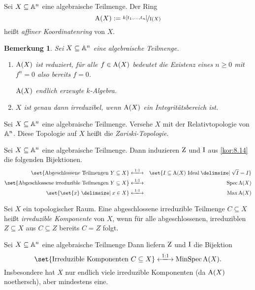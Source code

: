 \documentclass[12pt,a4paper]{scrartcl}
\theoremstyle{cplain}
\theoremstyle{cdef}
\newtheorem{beme}[thmcounter]{Bemerkung}
\begin{document}
\begin{defi}
	Sei $X\subseteq \mathbb A^n$ eine algebraische Teilmenge. Der Ring
	\[\operatorname{A}(X) := \nicefrac{k[t_1,\dots, t_n]}{\operatorname{I}(X)}\]
	heißt \emph{affiner Koordinatenring} von $X$.
	
\end{defi}
\begin{beme}
	Sei $X\subseteq \mathbb A^n$ eine algebraische Teilmenge.
	\begin{enumerate}
		\item $\operatorname{A}(X)$ ist \emph{reduziert}, für alle $f\in \operatorname{A}(X)$ bedeutet die Existenz eines $n\ge 0$ mit $f^n = 0$ also bereits $f = 0$.
		
		$\operatorname{A}(X)$ endlich erzeugte $k$-Algebra.
		\item $X$ ist genau dann irreduzibel, wenn $\operatorname{A}(X)$ ein Integritätsbereich ist.
	\end{enumerate}
\end{beme}
\begin{defi}
	Sei $X\subseteq \mathbb A^n$ eine algebraische Teilmenge. Versehe $X$ mit der Relativtopologie von $\mathbb A^n$. Diese Topologie auf $X$ heißt die \emph{Zariski-Topologie}.
\end{defi}
\begin{kor}
	Sei $X\subseteq\mathbb A^n$ eine algebraische Teilmenge. Dann induzieren $\operatorname{Z}$ und $\operatorname{I}$ aus \cref{kor:8.14} die folgenden Bijektionen.
	\begin{eqnarray*}
		\set{\text{Abgeschlossene Teilmengen }Y\subseteq X} &\xlongleftrightarrow{1:1}&\set{I\subseteq \A(X) \text{ Ideal}\given \sqrt{I} = I}\\
		\set{\text{Abgeschlossene irreduzible Teilmengen }Y\subseteq X}&\xlongleftrightarrow{1:1}&\Spec \A(X)\\
		\set{\set{x}\given x\in X}&\xlongleftrightarrow{1:1}&\Max \A(X)
	\end{eqnarray*}
\end{kor}
\begin{defi}
	Sei $X$ ein topologischer Raum. Eine abgeschlossene irreduzible Teilmenge $C\subseteq X$ heißt \emph{irreduzible Komponente} von $X$, wenn für alle abgeschlossenen, irreduziblen $Z\subseteq X$ aus $C\subseteq Z$ bereits $C = Z$ folgt.
\end{defi}
\begin{kor}
	Sei $X\subseteq \mathbb A^n$ eine algebraische Teilmenge Dann liefern $\operatorname{Z}$ und $\operatorname{I}$ die Bijektion
	\[\set{\text{Irreduzible Komponenten }C\subseteq X}\xlongleftrightarrow{1:1} \operatorname{MinSpec}\A(X).\]
	Insbesondere hat $X$ nur endlich viele irreduzible Komponenten \textup(da $\operatorname{A}(X)$ noethersch\textup), aber mindestens eine.
\end{kor}
\end{document}
